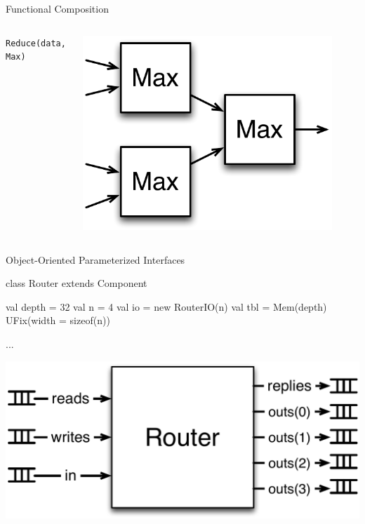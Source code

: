 \documentclass[xcolor=pdflatex,dvipsnames,table]{beamer}
\begin{document}
\begin{frame}[fragile]{Functional Composition}
\begin{columns}
\verb+Reduce(data, Max)+ \\
\begin{center}
\includegraphics[width=0.9\textwidth]{../bootcamp/figs/reduce.pdf} \\
\end{center}

\end{columns}
\end{frame}

\begin{frame}[fragile]{Object-Oriented Parameterized Interfaces}
\begin{scala}
class Router extends Component {
  val depth = 32
  val n     = 4
  val io    = new RouterIO(n)
  val tbl   = Mem(depth){ UFix(width = sizeof(n)) }
  
  ...
}
\end{scala}
\begin{center}
\includegraphics[height=0.45\textheight]{../bootcamp/figs/trouter.pdf} 
\end{center}
\end{frame}
\end{document}
